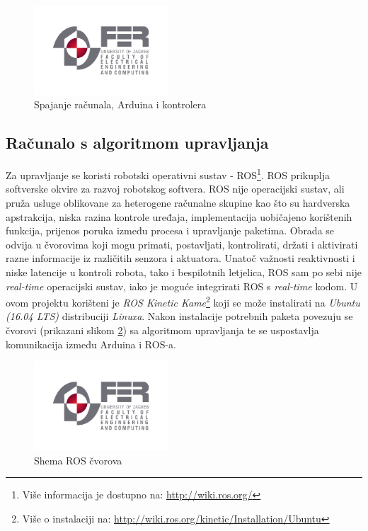 \documentclass[times, utf8, diplomski]{fer}
\begin{document}
\begin{figure}[htb]
\centering
\includegraphics[width=5cm]{img/fer_logo.jpg}
\caption{Spajanje računala, Arduina i kontrolera\protect\footnotemark}
\label{fig:cijeli sustav}
\end{figure}



\subsection{Računalo s algoritmom upravljanja}\label{sec:algoritam}
Za upravljanje se koristi robotski operativni sustav - ROS\footnote{Više informacija je dostupno na: \url{http://wiki.ros.org/}}. ROS prikuplja softverske okvire za razvoj robotskog softvera. ROS nije operacijski sustav, ali pruža usluge oblikovane za heterogene računalne skupine kao što su hardverska apstrakcija, niska razina kontrole uređaja, implementacija uobičajeno korištenih funkcija, prijenos poruka između procesa i upravljanje paketima. Obrada se odvija u čvorovima  koji mogu primati, postavljati, kontrolirati,  držati i aktivirati razne informacije iz različitih senzora i aktuatora. Unatoč važnosti reaktivnosti i niske latencije u kontroli robota, tako i bespilotnih letjelica, ROS sam po sebi nije \emph{real-time} operacijski sustav, iako je moguće integrirati ROS s \emph{real-time} kodom. U ovom projektu korišteni je \emph{ROS Kinetic Kame}\footnote{Više o instalaciji na: \url{http://wiki.ros.org/kinetic/Installation/Ubuntu}} koji se može instalirati na \emph{Ubuntu  (16.04 LTS)} distribuciji \emph{Linuxa}. Nakon instalacije potrebnih paketa povezuju se čvorovi (prikazani slikom \ref{fig:cvoroviROS}) sa algoritmom upravljanja te se uspostavlja komunikacija između Arduina i ROS-a.
\begin{figure}[htb]
\centering
\includegraphics[width=5cm]{img/fer_logo.jpg}
\caption{Shema ROS čvorova}
\label{fig:cvoroviROS}
\end{figure}
\end{document}
